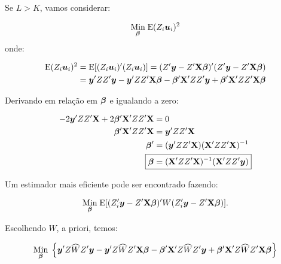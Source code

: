 \documentclass[11pt, oneside, a4paper, article]{article}
\numberwithin{equation}{section}
\begin{document}
\begin{description}
	\vspace{1 em}
	Se $L > K$, vamos considerar:

	\vspace{-1 em}
	\begin{align*}
		\underset{\boldsymbol{\beta}}{\text{Min}} \;
		\text{E}( Z_{i}\boldsymbol{u}_{i} )^2
	\end{align*}
	\noindent onde:

	\vspace{-1 em}
	\begin{align*}
		\text{E}( Z_{i}\boldsymbol{u}_{i} )^2 
		&=
		\text{E}[ ( Z_{i}\boldsymbol{u}_{i} )' ( Z_{i}\boldsymbol{u}_{i} ) ]
		=
		( Z' \boldsymbol{y} - Z' \mathbf{X} \boldsymbol{\beta} )' ( Z' \boldsymbol{y} - Z' \mathbf{X} \boldsymbol{\beta} )
		\\
		&=
		\boldsymbol{y}' ZZ' \boldsymbol{y}
		-
		\boldsymbol{y}' ZZ' \mathbf{X} \boldsymbol{\beta}
		-
		\boldsymbol{\beta}' \mathbf{X}' ZZ' \boldsymbol{y}
		+
		\boldsymbol{\beta}' \mathbf{X}' ZZ' \mathbf{X} \boldsymbol{\beta}
	\end{align*}

	Derivando em relação em $\boldsymbol{\beta}$ e igualando a zero:

	\vspace{-1 em}
	\begin{align*}
		-2 \yvec' ZZ' \Xmat + 2 \betavec'\Xmat' ZZ' \Xmat &= 0
		\\
		\betavec'\Xmat' ZZ' \Xmat &= \yvec' ZZ' \Xmat 
		\\
		\betavec' &= ( \yvec' ZZ' \Xmat ) ( \Xmat' ZZ' \Xmat )^{-1}
		\\
		\Aboxed{
		\betavec &= ( \Xmat' ZZ' \Xmat )^{-1} ( \Xmat' ZZ' \yvec ) }
	\end{align*}

	Um estimador mais eficiente pode ser encontrado fazendo:

	\vspace{-1 em}
	\begin{align*}
		\underset{\boldsymbol{\beta}}{\text{Min}} \;
		\text{E}[ ( Z_{i}' \boldsymbol{y} - Z' \mathbf{X} \boldsymbol{\beta} )' W ( Z_{i}' \boldsymbol{y} - Z' \mathbf{X} \boldsymbol{\beta} ) ].
	\end{align*}

	\noindent
	Escolhendo $\widehat{W}$, a priori, temos:

	\vspace{-1 em}
	\begin{align*}
		\underset{\boldsymbol{\beta}}{\text{Min}} \;
		\left\{ 
			\boldsymbol{y}' Z \widehat{W} Z' \boldsymbol{y}
			-
			\boldsymbol{y}' Z \widehat{W} Z' \mathbf{X} \boldsymbol{\beta}
			-
			\boldsymbol{\beta}' \mathbf{X}'  Z \widehat{W} Z' \boldsymbol{y}
			+
			\boldsymbol{\beta}' \mathbf{X}'  Z \widehat{W} Z' \mathbf{X} \boldsymbol{\beta}
		\right\}
	\end{align*}


\end{description}
\end{document}
